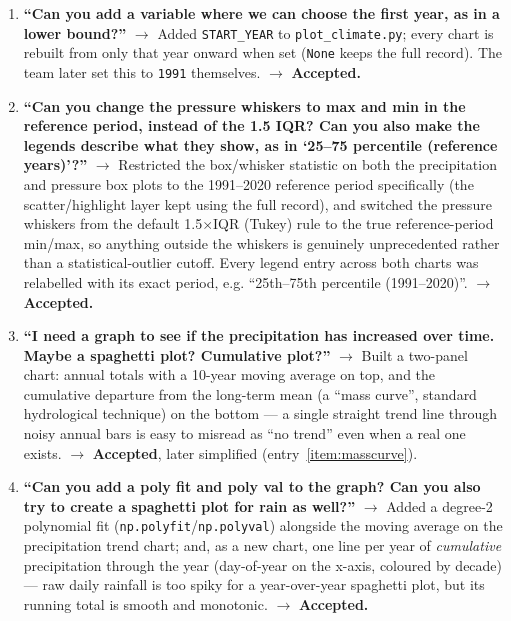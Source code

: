 \begin{enumerate}[leftmargin=*, itemsep=0.8em]
\item \textbf{``Can you add a variable where we can choose the first year, as in a lower
bound?''}
$\rightarrow$ Added \texttt{START\_YEAR} to \texttt{plot\_climate.py}; every chart is rebuilt
from only that year onward when set (\texttt{None} keeps the full record). The team later set
this to \texttt{1991} themselves.
$\rightarrow$ \textbf{Accepted.}

\item \textbf{``Can you change the pressure whiskers to max and min in the reference period,
instead of the 1.5 IQR? Can you also make the legends describe what they show, as in `25--75
percentile (reference years)'?''}
$\rightarrow$ Restricted the box/whisker statistic on both the precipitation and pressure box
plots to the 1991--2020 reference period specifically (the scatter/highlight layer kept using
the full record), and switched the pressure whiskers from the default 1.5$\times$IQR (Tukey)
rule to the true reference-period min/max, so anything outside the whiskers is genuinely
unprecedented rather than a statistical-outlier cutoff. Every legend entry across both charts
was relabelled with its exact period, e.g. ``25th--75th percentile (1991--2020)''.
$\rightarrow$ \textbf{Accepted.}

\item \textbf{``I need a graph to see if the precipitation has increased over time. Maybe a
spaghetti plot? Cumulative plot?''}
$\rightarrow$ Built a two-panel chart: annual totals with a 10-year moving average on top, and
the cumulative departure from the long-term mean (a ``mass curve'', standard hydrological
technique) on the bottom --- a single straight trend line through noisy annual bars is easy
to misread as ``no trend'' even when a real one exists.
$\rightarrow$ \textbf{Accepted}, later simplified (entry~\ref{item:masscurve}).

\item \textbf{``Can you add a poly fit and poly val to the graph? Can you also try to create
a spaghetti plot for rain as well?''}
$\rightarrow$ Added a degree-2 polynomial fit (\texttt{np.polyfit}/\texttt{np.polyval})
alongside the moving average on the precipitation trend chart; and, as a new chart, one line
per year of \emph{cumulative} precipitation through the year (day-of-year on the x-axis,
coloured by decade) --- raw daily rainfall is too spiky for a year-over-year spaghetti plot,
but its running total is smooth and monotonic.
$\rightarrow$ \textbf{Accepted.}


\end{enumerate}
